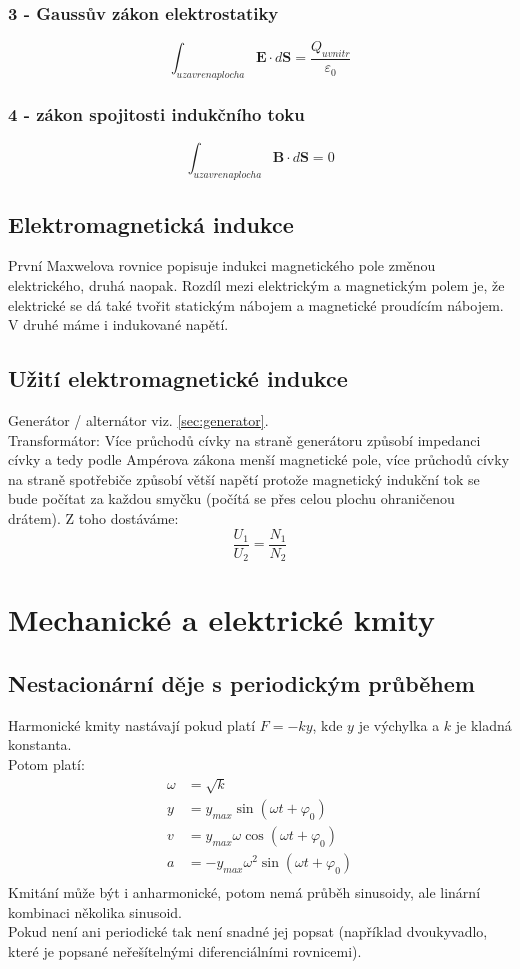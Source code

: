 \documentclass[titlepage]{report}
\begin{document}
\subsection{3 - Gaussův zákon elektrostatiky}
\begin{equation}
\int_{uzavrena plocha} \boldsymbol E \cdot d \boldsymbol S = \frac{Q_{uvnitr}}{\varepsilon_0}
\end{equation}
\subsection{4 - zákon spojitosti indukčního toku}
\begin{equation}
\int_{uzavrena plocha} \boldsymbol B \cdot d \boldsymbol S = 0
\end{equation}
\section{Elektromagnetická indukce}
První Maxwelova rovnice popisuje indukci magnetického pole změnou elektrického, druhá naopak. Rozdíl mezi elektrickým a magnetickým polem je, že elektrické se dá také tvořit statickým nábojem a magnetické proudícím nábojem. V druhé máme i indukované napětí.
\section{Užití elektromagnetické indukce}
Generátor / alternátor viz. \ref{sec:generator}.\\
Transformátor: Více průchodů cívky na straně generátoru způsobí impedanci cívky a tedy podle Ampérova zákona menší magnetické pole, více průchodů cívky na straně spotřebiče způsobí větší napětí protože magnetický indukční tok se bude počítat za každou smyčku (počítá se přes celou plochu ohraničenou drátem). Z toho dostáváme:
\begin{equation}
\frac{U_1}{U_2} = \frac{N_1}{N_2}
\end{equation}
\chapter{Mechanické a elektrické kmity}
\section{Nestacionární děje s periodickým průběhem}
Harmonické kmity nastávají pokud platí $F = -ky$, kde $y$ je výchylka a $k$ je kladná konstanta.\\
Potom platí:\\
\begin{align}
\omega &= \sqrt{k}\\
y &= y_{max}\sin(\omega t + \varphi_0)\\
v &= y_{max}\omega \cos(\omega t + \varphi_0)\\
a &= -y_{max}\omega^2 \sin(\omega t + \varphi_0)\\
\end{align}
Kmitání může být i anharmonické, potom nemá průběh sinusoidy, ale linární kombinaci několika sinusoid.\\
Pokud není ani periodické tak není snadné jej popsat (například dvoukyvadlo, které je popsané neřešítelnými diferenciálními rovnicemi).
\end{document}
